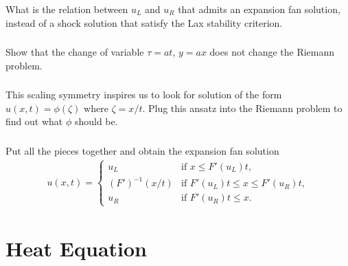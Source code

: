 \documentclass[11pt,letterpaper]{report}
\begin{document}
\subsection{}
What is the relation between $u_L$ and $u_R$ that admits an expansion fan solution, instead of a shock solution that satisfy the Lax stability criterion. 

\subsection{}
Show that the change of variable $\tau=at$, $y=ax$ does not change the Riemann problem. 

\subsection{}
This scaling symmetry inspires us to look for solution of the form $u(x,t) = \phi(\zeta)$ where $\zeta = x/t$. Plug this ansatz into the Riemann problem to find out what $\phi$ should be.

\subsection{}
Put all the pieces together and obtain the expansion fan solution
\begin{align}
    u(x,t) = \begin{cases}
        u_L &\text{if } x \leq F'(u_L) t, \\
        (F')^{-1}(x/t) &\text{if } F'(u_L) t \leq x \leq F'(u_R) t, \\
        u_R &\text{if } F'(u_R) t \leq x.
    \end{cases}
\end{align}

\chapter{Heat Equation}


\newpage
\printbibliography
\end{document}
